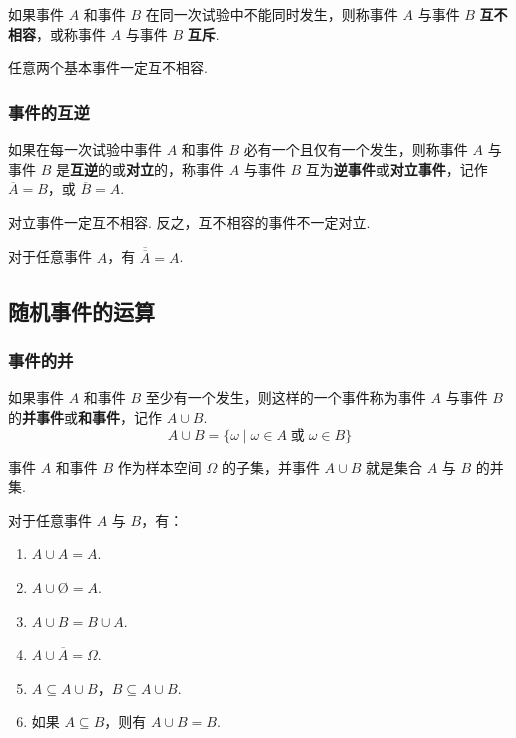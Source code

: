 如果事件 $A$ 和事件 $B$ 在同一次试验中不能同时发生，则称事件 $A$ 与事件 $B$ \textbf{互不相容}，或称事件 $A$ 与事件 $B$ \textbf{互斥}.

任意两个基本事件一定互不相容.

\subsubsection{事件的互逆}

如果在每一次试验中事件 $A$ 和事件 $B$ 必有一个且仅有一个发生，则称事件 $A$ 与事件 $B$ 是\textbf{互逆}的或\textbf{对立}的，称事件 $A$ 与事件 $B$ 互为\textbf{逆事件}或\textbf{对立事件}，记作 $\overline{A}=B$，或 $\overline{B}=A$.

对立事件一定互不相容. 反之，互不相容的事件不一定对立.

\begin{property}
    \indent 对于任意事件 $A$，有 $\overline{\overline{A}}=A$.
\end{property}

\subsection{随机事件的运算}

\subsubsection{事件的并}

如果事件 $A$ 和事件 $B$ 至少有一个发生，则这样的一个事件称为事件 $A$ 与事件 $B$ 的\textbf{并事件}或\textbf{和事件}，记作 $A \cup B$.
$$
A \cup B = \{ \omega \mid \omega \in A \;\text{或}\; \omega \in B \}
$$

事件 $A$ 和事件 $B$ 作为样本空间 $\varOmega$ 的子集，并事件 $A \cup B$ 就是集合 $A$ 与 $B$ 的并集.

\begin{property}
    \indent 对于任意事件 $A$ 与 $B$，有：
    \begin{enumerate}
        \item $A \cup A = A$.
        \item $A \cup \text{\O} = A$.
        \item $A \cup B = B \cup A$.
        \item $A \cup \overline{A} = \varOmega$.
        \item $A \subseteq A \cup B$，$B \subseteq A \cup B$.
        \item 如果 $A \subseteq B$，则有 $A \cup B=B$.
    \end{enumerate}
\end{property}

